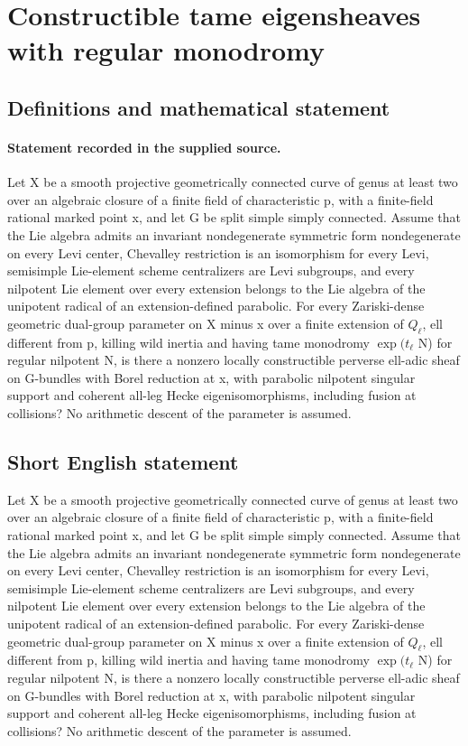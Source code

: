 \documentclass[11pt]{article}
\begin{document}
\section*{Constructible tame eigensheaves with regular monodromy}\label{statement}
\subsection{Definitions and mathematical statement}
\paragraph{Statement recorded in the supplied source.}
Let X be a smooth projective geometrically connected curve of genus at least two over an algebraic closure of a finite field of characteristic p, with a finite-field rational marked point x, and let G be split simple simply connected. Assume that the Lie algebra admits an invariant nondegenerate symmetric form nondegenerate on every Levi center, Chevalley restriction is an isomorphism for every Levi, semisimple Lie-element scheme centralizers are Levi subgroups, and every nilpotent Lie element over every extension belongs to the Lie algebra of the unipotent radical of an extension-defined parabolic. For every Zariski-dense geometric dual-group parameter on X minus x over a finite extension of $Q_\ell $, ell different from p, killing wild inertia and having tame monodromy $\exp (t_\ell $ N) for regular nilpotent N, is there a nonzero locally constructible perverse ell-adic sheaf on G-bundles with Borel reduction at x, with parabolic nilpotent singular support and coherent all-leg Hecke eigenisomorphisms, including fusion at collisions? No arithmetic descent of the parameter is assumed.
\subsection{Short English statement}
Let X be a smooth projective geometrically connected curve of genus at least two over an algebraic closure of a finite field of characteristic p, with a finite-field rational marked point x, and let G be split simple simply connected. Assume that the Lie algebra admits an invariant nondegenerate symmetric form nondegenerate on every Levi center, Chevalley restriction is an isomorphism for every Levi, semisimple Lie-element scheme centralizers are Levi subgroups, and every nilpotent Lie element over every extension belongs to the Lie algebra of the unipotent radical of an extension-defined parabolic. For every Zariski-dense geometric dual-group parameter on X minus x over a finite extension of $Q_\ell $, ell different from p, killing wild inertia and having tame monodromy $\exp (t_\ell $ N) for regular nilpotent N, is there a nonzero locally constructible perverse ell-adic sheaf on G-bundles with Borel reduction at x, with parabolic nilpotent singular support and coherent all-leg Hecke eigenisomorphisms, including fusion at collisions? No arithmetic descent of the parameter is assumed.
\end{document}

